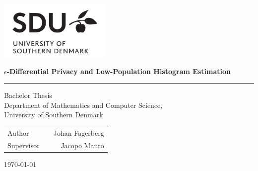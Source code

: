 \begin{titlepage}
       \Large
       \begin{center}
           \includegraphics[width=0.4\textwidth]{imgs/logo.png}
       \end{center}
       \renewcommand{\thepage}{Title}
       \thispagestyle{empty}
          \begin{center}
              \vspace*{1cm}
       \linespread{1.25}
              {\doublespacing \Huge\textbf{$\epsilon$-Differential Privacy and Low-Population Histogram Estimation}}
       \linespread{1}
              \vspace*{0.5cm}
              \rule{\linewidth}{1pt}
              \vspace*{1em}
              {\huge Bachelor Thesis \\
              \Large Department of Mathematics and Computer Science, \\
              University of Southern Denmark}
       \end{center}
       \vspace{2cm}
       \Large
       \begin{tabularx}{\textwidth}{lXr}
           Author & & Johan Fagerberg \\
           Supervisor & & Jacopo Mauro \\
       \end{tabularx}
       
       \vfill
       \begin{center}
           \large \today
       \end{center}
       \end{titlepage}
